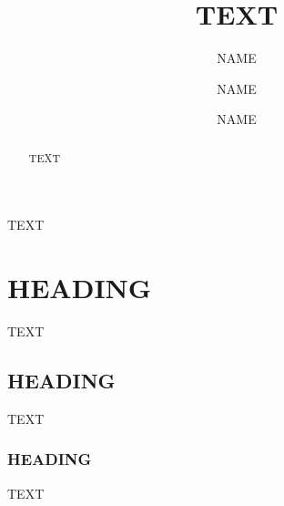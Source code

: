 \documentclass[journal abbreviation]{copernicus}
\begin{document}
\linenumbers

\title{TEXT}


\author[]{NAME}
\author[]{NAME}
\author[]{NAME}










\received{}
\pubdiscuss{} %
\revised{}
\accepted{}
\published{}




\maketitle  %



\begin{abstract}
TEXT
\end{abstract}





\introduction  %
TEXT



\section{HEADING}
TEXT

\subsection{HEADING}
TEXT

\subsubsection{HEADING}
TEXT
\end{document}
